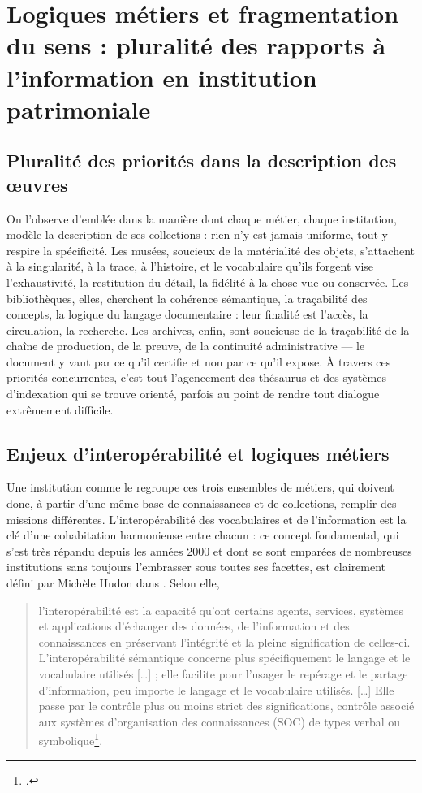 \section{\label{II-B-2}Logiques métiers et fragmentation du sens : pluralité des rapports à l’information en institution patrimoniale}


\subsection{Pluralité des priorités dans la description des œuvres}

On l’observe d’emblée dans la manière dont chaque métier, chaque institution, modèle la description de ses collections : rien n’y est jamais uniforme, tout y respire la spécificité. Les musées, soucieux de la matérialité des objets, s’attachent à la singularité, à la trace, à l’histoire, et le vocabulaire qu’ils forgent vise l’exhaustivité, la restitution du détail, la fidélité à la chose vue ou conservée. Les bibliothèques, elles, cherchent la cohérence sémantique, la traçabilité des concepts, la logique du langage documentaire : leur finalité est l’accès, la circulation, la recherche. Les archives, enfin, sont soucieuse de la traçabilité de la chaîne de production, de la preuve, de la continuité administrative — le document y vaut par ce qu’il certifie et non par ce qu’il expose. À travers ces priorités concurrentes, c’est tout l’agencement des thésaurus et des systèmes d’indexation qui se trouve orienté, parfois au point de rendre tout dialogue extrêmement difficile.

\subsection{Enjeux d’interopérabilité et logiques métiers}

Une institution comme le \mae regroupe ces trois ensembles de métiers, qui doivent donc, à partir d'une même base de connaissances et de collections, remplir des missions différentes. L’interopérabilité des vocabulaires et de l'information est la clé d'une cohabitation harmonieuse entre chacun : ce concept fondamental, qui s'est très répandu depuis les années 2000 et dont se sont emparées de nombreuses institutions sans toujours l'embrasser sous toutes ses facettes, est clairement défini par Michèle Hudon dans . Selon elle, 
\begin{quote}
	l’interopérabilité est la capacité qu’ont certains agents, services, systèmes et applications d’échanger des données, de l’information et des connaissances en préservant l’intégrité et la pleine signification de celles-ci. L’interopérabilité sémantique concerne plus spécifiquement le langage et le vocabulaire utilisés […] ; elle facilite pour l’usager le repérage et le partage d’information, peu importe le langage et le vocabulaire utilisés. […] Elle passe par le contrôle plus ou moins strict des significations, contrôle associé aux systèmes d’organisation des connaissances (SOC) de types verbal ou symbolique\footcite{hudonISO25964Pour2012a}.
\end{quote}

